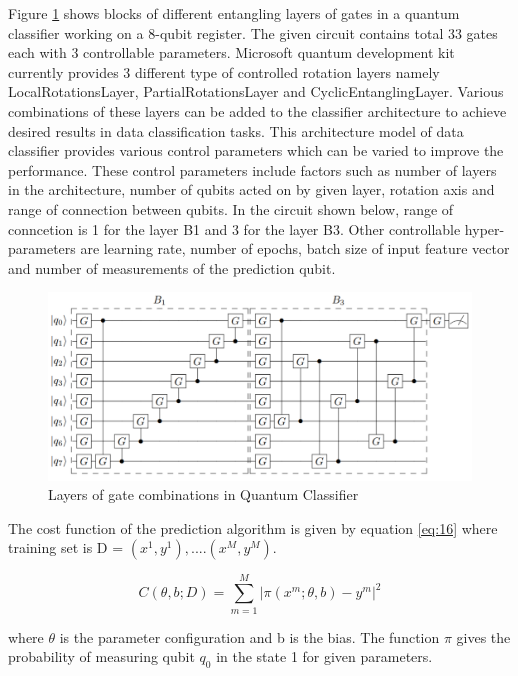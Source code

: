 \documentclass[english,a4paper,11pt,oneside,onecolumn]{book}
\begin{document}
Figure \ref{fig:gateBlocks} shows blocks of different entangling layers of gates in a quantum classifier working on a 8-qubit register. The given circuit contains total 33 gates each with 3 controllable parameters. Microsoft quantum development kit currently provides 3 different type of controlled rotation layers namely LocalRotationsLayer, PartialRotationsLayer and CyclicEntanglingLayer. Various combinations of these layers can be added to the classifier architecture to achieve desired results in data classification tasks. This architecture model of data classifier provides various control parameters which can be varied to improve the performance. These control parameters include factors such as number of layers in the architecture, number of qubits acted on by given layer, rotation axis and range of connection between qubits. In the circuit shown below, range of conncetion is 1 for the layer B1 and 3 for the layer B3.  Other controllable hyper-parameters are learning rate, number of epochs, batch size of input feature vector and number of measurements of the prediction qubit.

\begin{figure}[H]
    \centering
    \includegraphics[scale=0.7]{Images/GradientGateBlocks.PNG}
    \caption{Layers of gate combinations in Quantum Classifier \cite{schuld_2020_circuitcentric}}
    \label{fig:gateBlocks}
\end{figure}

The cost function of the prediction algorithm is given by equation \ref{eq:16} where training set is D = ${(x^1, y^1),....(x^M, y^M)}$.

\begin{equation}\label{eq:16}
C(\theta, b; D) = \sum_{m=1}^{M} |\pi(x^m; \theta, b) - y^m|^2
\end{equation}

where \(\theta\) is the parameter configuration and b is the bias. The function $\pi$ gives the probability of measuring qubit \(q_0\) in the state 1 for given parameters.
\end{document}

